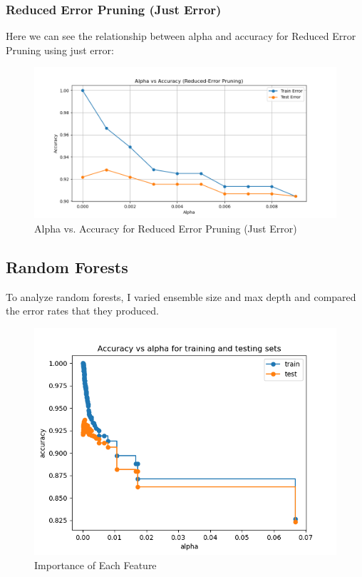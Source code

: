 \documentclass[12pt]{article}
\begin{document}
\subsubsection{Reduced Error Pruning (Just Error)}

Here we can see the relationship between alpha and accuracy for Reduced Error Pruning using just error:

\begin{figure}[h!]
    \centering
    \includegraphics[width=0.8\linewidth]{figures/Reduced Error Pruning/alpha vs accuracy.png}
    \caption{Alpha vs. Accuracy for Reduced Error Pruning (Just Error)}
    \label{fig:error}
\end{figure}

\subsection{Random Forests}

To analyze random forests, I varied ensemble size and max depth and compared the error rates that they produced.

\begin{figure}[h!]
    \centering
    \includegraphics[width=0.8\linewidth]{figures/CCP/Accuracy vs alpha for train and test sets.png}
    \caption{Importance of Each Feature}
    \label{fig:mcc}
\end{figure}
\end{document}
